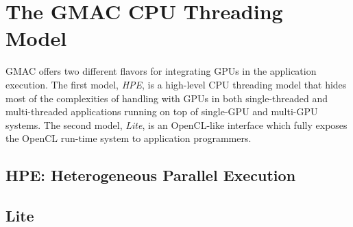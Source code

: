 \section{The GMAC CPU Threading Model}

GMAC offers two different flavors for integrating GPUs in the application execution. The first 
model, \emph{HPE}, is a high\hyp{}level CPU threading model that hides most of the complexities of 
handling with GPUs in both single\hyp{}threaded and multi\hyp{}threaded applications running on top 
of single\hyp{}GPU and multi\hyp{}GPU systems. The second model, \emph{Lite}, is an OpenCL\hyp{}like 
interface which fully exposes the OpenCL run\hyp{}time system to application programmers.

\subsection{HPE: Heterogeneous Parallel Execution}

\subsection{Lite}


